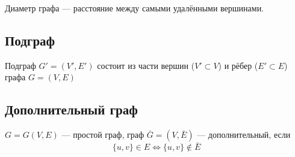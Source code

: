 \documentclass[a4paper,12pt]{article} %
\begin{document}
Диаметр графа --- расстояние между самыми удалёнными вершинами.

\subsection{Подграф}

Подграф $G' = (V',E')$ состоит из части вершин ($V' \subset V$) и рёбер ($E' 
\subset E$) графа $G = (V,E)$

\subsection{Дополнительный граф}

$G = G(V,E)$ --- простой граф, граф $\bar{G} = (V,\bar{E})$ --- дополнительный, если
$$ \{u,v\} \in E \Leftrightarrow \{u,v\} \notin \bar{E}$$
\end{document}
